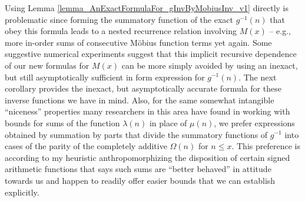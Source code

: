 \documentclass[11pt,reqno,a4letter]{article}
\numberwithin{figure}{section}
\numberwithin{table}{section}
\theoremstyle{plain}
\numberwithin{theorem}{section}
\theoremstyle{definition}
\begin{document}
Using Lemma \ref{lemma_AnExactFormulaFor_gInvByMobiusInv_v1} directly is problematic since 
forming the summatory function of the exact $g^{-1}(n)$ that obey this formula leads to 
a nested recurrence relation involving $M(x)$ -- e.g., 
more in-order sums of consecutive M\"obius function terms yet again. 
Some suggestive numerical experiments suggest that this implicit recursive 
dependence of our new formulas for $M(x)$ can be more simply avoided by using an inexact, but still 
asymptotically sufficient in form expression for $g^{-1}(n)$. The next corollary provides the 
inexact, but asymptotically accurate formula for these inverse functions we have in mind. 
Also, for the same somewhat intangible ``niceness'' properties 
many researchers in this area have found in working with bounds for sums of the 
function $\lambda(n)$ in place of $\mu(n)$, we prefer expressions obtained by summation by parts that 
divide the summatory functions of $g^{-1}$ into cases of the parity of the completely additive 
$\Omega(n)$ for $n \leq x$. This preference is according to my heuristic 
anthropomorphizing the disposition of certain signed arithmetic 
functions that says such sums 
are ``better behaved'' in attitude towards us and happen to readily offer 
easier bounds that we can establish explicitly. 
\end{document}
